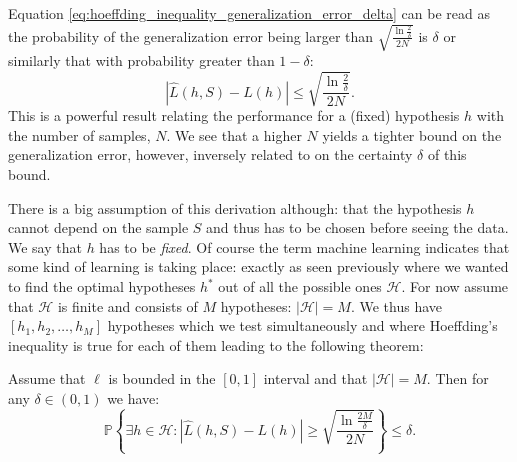 Equation \eqref{eq:hoeffding_inequality_generalization_error_delta} can be read as the probability of the generalization error being larger than $\sqrt{\frac{\ln \frac{2}{\delta}}{2N}}$ is $\delta$ or similarly that with probability greater than $1-\delta$:
\begin{equation}
  \label{eq:hoeffding_inequality_single_PAC}
  \left| \hat{L}(h, S) - L(h) \right| \leq \sqrt{\frac{\ln \frac{2}{\delta}}{2N}}.
\end{equation}
This is a powerful result relating the performance for a (fixed) hypothesis $h$ with the number of samples, $N$. We see that a higher $N$ yields a tighter bound on the generalization error, however, inversely related to on the certainty $\delta$ of this bound. 

There is a big assumption of this derivation although: that the hypothesis $h$ cannot depend on the sample $S$ and thus has to be chosen before seeing the data. We say that $h$ has to be \emph{fixed}. Of course the term machine learning indicates that some kind of learning is taking place: exactly as seen previously where we wanted to find the optimal hypotheses $h^*$ out of all the possible ones $\mathcal{H}$. For now assume that $\mathcal{H}$ is finite and consists of $M$ hypotheses: $|\mathcal{H}| = M$. We thus have $[h_1, h_2, \dots, h_M]$ hypotheses which we test simultaneously and where Hoeffding's inequality is true for each of them leading to the following theorem:
\begin{theorem}
  \label{theorem:hoeffding_finite}
  Assume that $\ell$ is bounded in the $[0, 1]$ interval and that $|\mathcal{H}| = M$. Then for any $\delta\in(0,1)$ we have:  
  \begin{equation}
    \label{eq:hoeffding_inequality_theorem_multiple}
    \mathbb{P} \left\{ \exists h \in \mathcal{H}: \left| \hat{L}(h, S) - L(h) \right| \geq \sqrt{\frac{\ln \frac{2M}{\delta}}{2N}}  \right\} \leq \delta.
  \end{equation}
\end{theorem}

